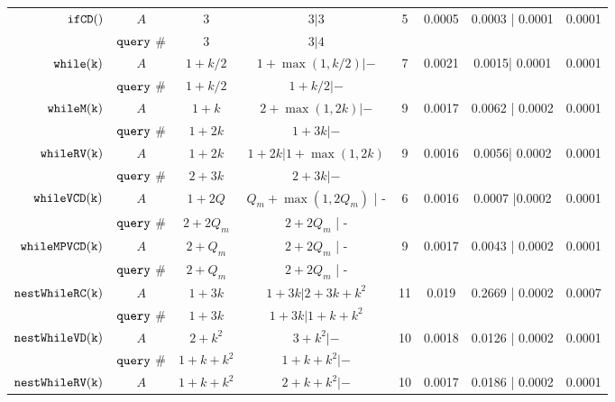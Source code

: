\begin {table}[H]
\begin{center}
{\begin{tabular}{ r | c | c | c | c | c | c | c  }
         $  \mathtt{ifCD()}$ 
         & $A$ & $3$ & $3 | 3$  & 5 & 0.0005 & 0.0003 | 0.0001  & 0.0001 \\
         \cline{2-4}
         & ${\tt query}$ \#   & 3  &   $3| 4$ & & & & \\
         \hline
         $  \mathtt{while(k)}$ 
         & $A$ & $1+k/2$ & $1 +\max(1, k/2) |- $  & 7 & 0.0021 & 0.0015| 0.0001 &  0.0001 \\
         \cline{2-4}
         & ${\tt query}$ \#   &  $1+k/2$ &  $1+k/2 | - $  & & & & \\
         \hline
         $  \mathtt{whileM(k)}$ 
         & $A$ &  $1 + k$  & $ 2 + \max(1,2k) | -$  &  9 & 0.0017 & 0.0062 | 0.0002 & 0.0001  \\
         \cline{2-4}
         & ${\tt query}$ \#   & $1+2k $ & $1 + 3k | -$  & & & & \\
         \hline
         $  \mathtt{whileRV(k)}$ 
         & $A$ & $1 + 2k$ &  $1 + 2k| 1 + \max(1,2k)$  &  9 & 0.0016 & 0.0056| 0.0002 & 0.0001  \\
         \cline{2-4}
         & ${\tt query}$ \#   & {$2 + 3 k$} & $2 + 3 k| -$   & & & & \\
         \hline
         $  {\mathtt{whileVCD(k)}} $ 
         & $A$ & ${1 + 2Q}$ &  ${Q_m+\max(1,2Q_m)}$ | - &  6 & 0.0016 & 0.0007 |0.0002 & 0.0001 \\
         \cline{2-4}
         & ${\tt query}$ \#   &{$2+2Q_m$} & $2+2Q_m$ | -   & & & & \\
         \hline
         $ {\mathtt{whileMPVCD(k)}}$ 
         & $A$ &  $2 + Q_m$ & $2+2Q_m$ | -  &   9 & 0.0017 & 0.0043 | 0.0002 & 0.0001 \\
         \cline{2-4}
         & ${\tt query}$ \#   & $2+Q_m$ & $2+2Q_m$ | - & & & & \\
         \hline
         $\mathtt{nestWhileRC(k)}$ 
         & $A$ & $1 + 3k$ &  $1 + 3k | 2 + 3k + k^2$   &  11 & 0.019 & 0.2669 | 0.0002 & 0.0007 \\
         \cline{2-4}
         & ${\tt query}$ \#   & $1 + 3k$ &  $1 + 3k | 1 + k + k^2$ & & & & \\
         \hline
         $\mathtt{nestWhileVD(k)}$ 
         & $A$ & $2 + k^2$ &   $3 + k^2| -$    &  10 & 0.0018 & 0.0126 | 0.0002 & 0.0001  \\
         \cline{2-4}
         & ${\tt query}$ \#   & $1 + k + k^2$ & $1 + k + k^2|- $ & & & & \\
         \hline
         $\mathtt{nestWhileRV(k)}$ 
         & $A$ & $1 + k + k^2$ &  $ 2 + k +  k^2 | -$   &  10 & 0.0017 & 0.0186 | 0.0002 & 0.0001  \\

\end{tabular}}
\end{center}
\end{table}
